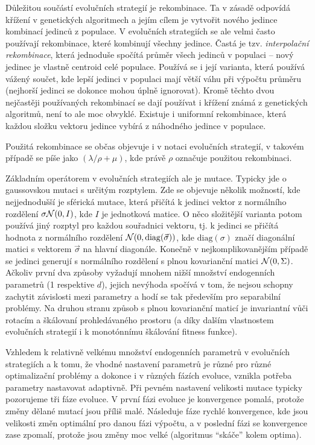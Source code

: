 Důležitou součástí evolučních strategií je rekombinace. Ta v zásadě odpovídá křížení v genetických algoritmech a jejím cílem je vytvořit nového jedince kombinací jedinců z populace. V evolučních strategiích se ale velmi často používají rekombinace, které kombinují všechny jedince. Častá je tzv. \emph{interpolační rekombinace}, která jednoduše spočítá průměr všech jedinců v populaci -- nový jedinec je vlastně centroid celé populace. Používá se i její varianta, která používá vážený součet, kde lepší jedinci v populaci mají větší váhu při výpočtu průměru (nejhorší jedinci se dokonce mohou úplně ignorovat). Kromě těchto dvou nejčastěji používaných rekombinací se dají používat i křížení známá z genetických algoritmů, není to ale moc obvyklé. Existuje i uniformní rekombinace, která každou složku vektoru jedince vybírá z náhodného jedince v populace. 

Použitá rekombinace se občas objevuje i v notaci evolučních strategií, v takovém případě se píše jako $(\lambda/\rho + \mu)$, kde právě $\rho$ označuje použitou rekombinaci.

Základním operátorem v evolučních strategiích ale je mutace. Typicky jde o gaussovskou mutaci s určitým rozptylem. Zde se objevuje několik možností, kde nejjednodušší je sférická mutace, která přičítá k jedinci vektor z normálního rozdělení $\sigma\mathcal{N}(0, I)$, kde $I$ je jednotková matice. O něco složitější varianta potom používá jiný rozptyl pro každou souřadnici vektoru, tj. k jedinci se přičítá hodnota z normálního rozdělení $\mathcal{N}(0, \mathrm{diag}({\vec{\sigma}}))$, kde $\mathrm{diag}(\sigma)$ značí diagonální matici s vektorem $\vec{\sigma}$ na hlavní diagonále. Konečně v nejkomplikovanějším případě se jedinci generují s normálního rozdělení s plnou kovarianční matici $\mathcal{N}(0, \Sigma)$. Ačkoliv první dva způsoby vyžadují mnohem nižší množství endogenních parametrů (1 respektive $d$), jejich nevýhoda spočívá v tom, že nejsou schopny zachytit závislosti mezi parametry a hodí se tak především pro separabilní problémy. Na druhou stranu způsob s plnou kovarianční maticí je invariantní vůči rotacím a škálovaní prohledávaného prostoru (a díky dalším vlastnostem evolučních strategií i k monotónnímu škálování fitness funkce).

Vzhledem k relativně velkému množství endogenních parametrů v evolučních strategiích a k tomu, že vhodné nastavení parametrů je různé pro různé optimalizační problémy a dokonce i v různých fázích evoluce, vznikla potřeba parametry nastavovat adaptivně. Při pevném nastavení velikosti mutace typicky pozorujeme tři fáze evoluce. V první fázi evoluce je konvergence pomalá, protože změny dělané mutací jsou příliš malé. Následuje fáze rychlé konvergence, kde jsou velikosti změn optimální pro danou fázi výpočtu, a v poslední fázi se konvergence zase zpomalí, protože jsou změny moc velké (algoritmus ``skáče'' kolem optima).

